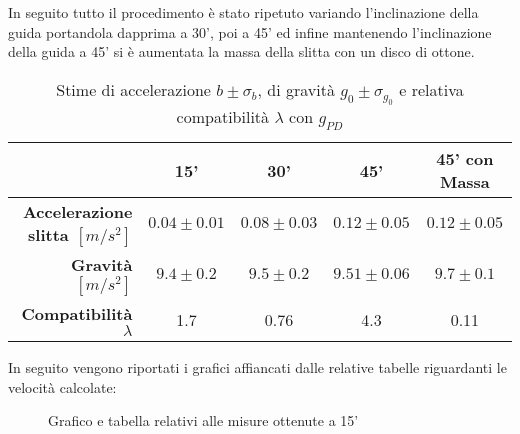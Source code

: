 \documentclass[a4paper,11pt,oneside]{article}
\begin{document}
In seguito tutto il procedimento è stato ripetuto variando l'inclinazione della guida portandola dapprima a 30', poi a 45' ed infine mantenendo l'inclinazione della guida a 45' si è aumentata la massa della slitta con un disco di ottone.\\

\begin{table}[h!]%
    \centering
    \begin{tabular}{r|c|c|c|c}
    \toprule
    & \textbf{15'} & \textbf{30'} & \textbf{45'} & \textbf{45' con Massa}\\
    \midrule
         \textbf{Accelerazione slitta $[\si{m/s^2}]$} & $0.04\pm0.01$    & $0.08\pm0.03$   & $0.12\pm0.05$    & $0.12\pm0.05$\\
        \textbf{Gravità $[\si{m/s^2}]$}       & $9.4\pm0.2$ & $9.5\pm0.2$ & $9.51\pm0.06$ & $9.7\pm0.1$ \\
        \textbf{Compatibilità $\lambda$} &1.7 &0.76 &4.3 &0.11\\
        \bottomrule
    \end{tabular}
    \caption{Stime di accelerazione $b\pm \sigma_{b}$, di gravità $g_{0} \pm \sigma_{g_{0}}$ e relativa compatibilità $\lambda$ con $g_{PD}$}
    \label{tab:stima_b_g}
\end{table}

\bigskip
In seguito vengono riportati i grafici affiancati dalle relative tabelle riguardanti le velocità calcolate:
\bigskip
\bigskip

\begin{figure}[h!]
    \centering
    \caption{Grafico e tabella relativi alle misure ottenute a 15'}
\end{figure}
\end{document}
